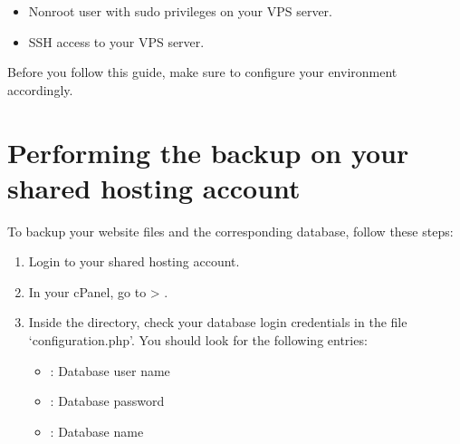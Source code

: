 \documentclass[a4paper,10pt,english,openany,oneside]{sphinxmanual}
\begin{document}
\begin{sloppypar}
\begin{itemize}
\item {} 
\sphinxAtStartPar
Non\sphinxhyphen{}root user with sudo privileges on your VPS server.

\item {} 
\sphinxAtStartPar
SSH access to your VPS server.

\end{itemize}

\sphinxAtStartPar
Before you follow this guide, make sure to configure your environment accordingly.


\section{Performing the backup on your shared hosting account}
\label{\detokenize{joomla-to-vps:performing-the-backup-on-your-shared-hosting-account}}\label{\detokenize{joomla-to-vps:credentials}}
\sphinxAtStartPar
To backup your website files and the corresponding database, follow these steps:
\begin{enumerate}
%
\item {} 
\sphinxAtStartPar
Login to your shared hosting account.

\item {} 
\sphinxAtStartPar
In your cPanel, go to  > .
\begin{quote}

\begin{figure}[H]
\centering

\noindent{}
\end{figure}
\end{quote}

\item {} 
\sphinxAtStartPar
Inside the  directory, check your database login credentials in the file ‘configuration.php’. You should look for the following entries:
\begin{itemize}
\item {} 
\sphinxAtStartPar
{}: Database user name

\item {} 
\sphinxAtStartPar
{}: Database password

\item {} 
\sphinxAtStartPar
{}: Database name


\end{itemize}
\end{enumerate}
\end{sloppypar}
\end{document}
